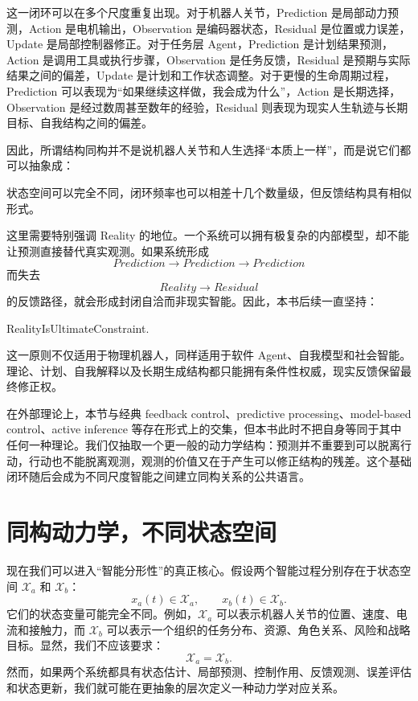 这一闭环可以在多个尺度重复出现。对于机器人关节，Prediction 是局部动力预测，Action 是电机输出，Observation 是编码器状态，Residual 是位置或力误差，Update 是局部控制器修正。对于任务层 Agent，Prediction 是计划结果预测，Action 是调用工具或执行步骤，Observation 是任务反馈，Residual 是预期与实际结果之间的偏差，Update 是计划和工作状态调整。对于更慢的生命周期过程，Prediction 可以表现为“如果继续这样做，我会成为什么”，Action 是长期选择，Observation 是经过数周甚至数年的经验，Residual 则表现为现实人生轨迹与长期目标、自我结构之间的偏差。

因此，所谓结构同构并不是说机器人关节和人生选择“本质上一样”，而是说它们都可以抽象成：
\begin{statementbox}
\centering
{}
\end{statementbox}
状态空间可以完全不同，闭环频率也可以相差十几个数量级，但反馈结构具有相似形式。

这里需要特别强调 Reality 的地位。一个系统可以拥有极复杂的内部模型，却不能让预测直接替代真实观测。如果系统形成
\[
Prediction
\rightarrow
Prediction
\rightarrow
Prediction
\]
而失去
\[
Reality
\rightarrow
Residual
\]
的反馈路径，就会形成封闭自洽而非现实智能。因此，本书后续一直坚持：
\begin{statementbox}
RealityIsUltimateConstraint.
\end{statementbox}
这一原则不仅适用于物理机器人，同样适用于软件 Agent、自我模型和社会智能。理论、计划、自我解释以及长期生成结构都只能拥有条件性权威，现实反馈保留最终修正权。

在外部理论上，本节与经典 feedback control、predictive processing、model-based control、active inference 等存在形式上的交集，但本书此时不把自身等同于其中任何一种理论。我们仅抽取一个更一般的动力学结构：预测并不重要到可以脱离行动，行动也不能脱离观测，观测的价值又在于产生可以修正结构的残差。这个基础闭环随后会成为不同尺度智能之间建立同构关系的公共语言。

\section{同构动力学，不同状态空间}

现在我们可以进入“智能分形性”的真正核心。假设两个智能过程分别存在于状态空间 $\mathcal{X}_a$ 和 $\mathcal{X}_b$：
\[
x_a(t)\in\mathcal{X}_a,
\qquad
x_b(t)\in\mathcal{X}_b.
\]
它们的状态变量可能完全不同。例如，$\mathcal{X}_a$ 可以表示机器人关节的位置、速度、电流和接触力，而 $\mathcal{X}_b$ 可以表示一个组织的任务分布、资源、角色关系、风险和战略目标。显然，我们不应该要求：
\[
\mathcal{X}_a=\mathcal{X}_b.
\]
然而，如果两个系统都具有状态估计、局部预测、控制作用、反馈观测、误差评估和状态更新，我们就可能在更抽象的层次定义一种动力学对应关系。

